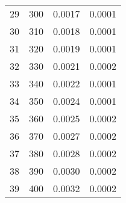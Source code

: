 \begin{table}[H]
\begin{tabular}{cccc}
\cline{1-4}
29 & 300 & 0.0017 & 0.0001 \\
\cline{1-4}
30 & 310 & 0.0018 & 0.0001 \\
\cline{1-4}
31 & 320 & 0.0019 & 0.0001 \\
\cline{1-4}
32 & 330 & 0.0021 & 0.0002 \\
\cline{1-4}
33 & 340 & 0.0022 & 0.0001 \\
\cline{1-4}
34 & 350 & 0.0024 & 0.0001 \\
\cline{1-4}
35 & 360 & 0.0025 & 0.0002 \\
\cline{1-4}
36 & 370 & 0.0027 & 0.0002 \\
\cline{1-4}
37 & 380 & 0.0028 & 0.0002 \\
\cline{1-4}
38 & 390 & 0.0030 & 0.0002 \\
\cline{1-4}
39 & 400 & 0.0032 & 0.0002 \\
\cline{1-4}
\end{tabular}
\end{table}
